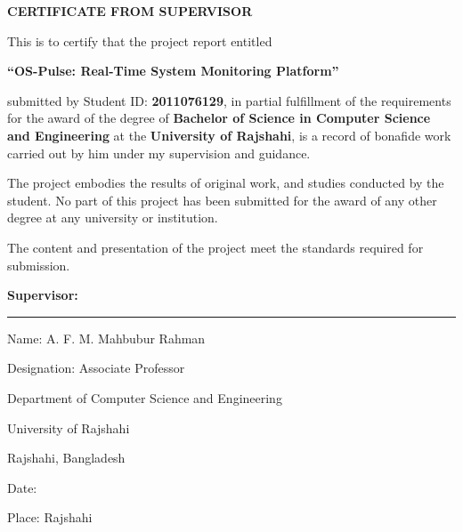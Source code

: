 \newpage
\thispagestyle{empty}

\begin{center}
    \vspace*{2cm}
    
    {\LARGE\bfseries CERTIFICATE FROM SUPERVISOR}
    
    \vspace{2cm}
\end{center}

\noindent This is to certify that the project report entitled

\vspace{0.5cm}

\begin{center}
    {\large\bfseries ``OS-Pulse: Real-Time System Monitoring Platform''}
\end{center}

\vspace{0.5cm}

\noindent submitted by Student ID: \textbf{2011076129}, in partial fulfillment of the requirements for the award of the degree of \textbf{Bachelor of Science in Computer Science and Engineering} at the \textbf{University of Rajshahi}, is a record of bonafide work carried out by him under my supervision and guidance.

\vspace{0.5cm}

\noindent The project embodies the results of original work, and studies conducted by the student. No part of this project has been submitted for the award of any other degree at any university or institution.

\vspace{0.5cm}

\noindent The content and presentation of the project meet the standards required for submission.

\vspace{3cm}

\noindent\textbf{Supervisor:}

\vspace{1cm}

\noindent\rule{5cm}{0.4pt}

\noindent Name: A. F. M. Mahbubur Rahman

\noindent Designation: Associate Professor

\noindent Department of Computer Science and Engineering

\noindent University of Rajshahi

\noindent Rajshahi, Bangladesh

\vspace{1cm}

\noindent Date: \underline{\hspace{4cm}}

\noindent Place: Rajshahi